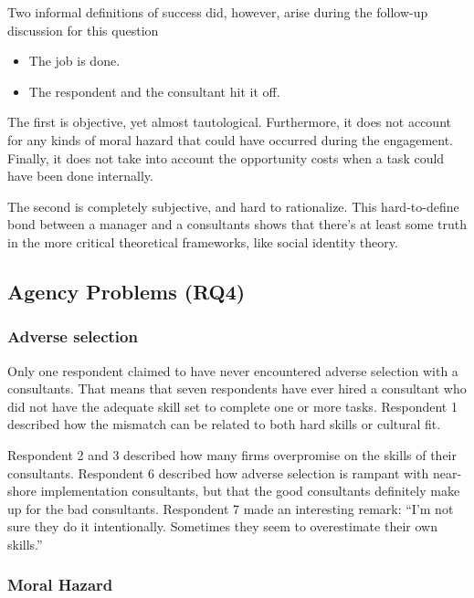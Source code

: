 \documentclass[12pt]{article}
\begin{document}
Two informal definitions of success did, however, arise during the
follow-up discussion for this question

\begin{itemize}
\item
  The job is done.
\item
  The respondent and the consultant hit it off.
\end{itemize}

The first is objective, yet almost tautological. Furthermore, it does
not account for any kinds of moral hazard that could have occurred
during the engagement. Finally, it does not take into account the
opportunity costs when a task could have been done internally.

The second is completely subjective, and hard to rationalize. This
hard-to-define bond between a manager and a consultants shows that
there's at least some truth in the more critical theoretical frameworks,
like social identity theory.

\subsection{Agency Problems (RQ4)}\label{agency-problems-rq4}

\subsubsection{Adverse selection}\label{adverse-selection}

Only one respondent claimed to have never encountered adverse selection
with a consultants. That means that seven respondents have ever hired a
consultant who did not have the adequate skill set to complete one or
more tasks. Respondent 1 described how the mismatch can be related to
both hard skills or cultural fit.

Respondent 2 and 3 described how many firms overpromise on the skills of
their consultants. Respondent 6 described how adverse selection is
rampant with near-shore implementation consultants, but that the good
consultants definitely make up for the bad consultants. Respondent 7
made an interesting remark: ``I'm not sure they do it intentionally.
Sometimes they seem to overestimate their own skills.''

\subsubsection{Moral Hazard}\label{moral-hazard}
\end{document}
